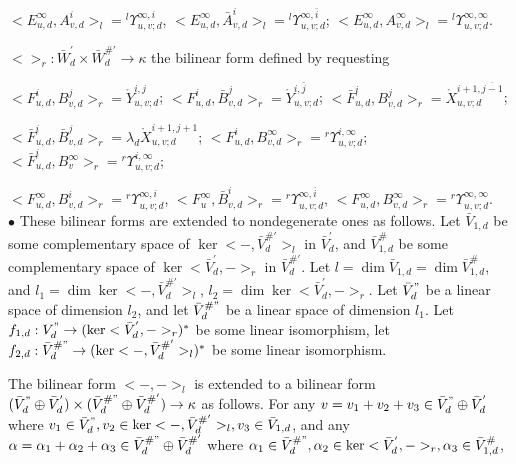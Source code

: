\def\CTEXPreproc{Created by ctex v0.2.12, don't edit!}\documentclass[11pt]{article}
\begin{document}
\begin{pf}
 \noindent $< E^{\infty} _{u,d} , A^{i} _{v,d}   >_l ={}^{l}\Upsilon^{\infty,i}_{u,v;d}$,  $< E^{\infty} _{u,d} , \bar{A}^{i} _{v,d}   >_l ={}^{l}\Upsilon^{\infty,\bar{i}}_{u,v;d} $; $< E^{\infty}_{u,d} , A^{\infty}_{v,d}  >_l ={}^{l}\Upsilon^{\infty,\infty}_{u,v;d}. $

\noindent $ < >_r : \bar{W}^{'}_{d} \times \bar{W}^{\# '}_{d} \rightarrow \kappa    $ the bilinear form defined by requesting

     \noindent $< F^i _{u,d} , B^j _{v,d}   >_r =\mathring{Y}^{i,j}_{u,v;d} $; $< F^i _{u,d} , \bar{B}^j _{v,d}   >_r =\mathring{Y}^{i,\bar{j}}_{u,v;d} $; $< \bar{F}^i _{u,d} , B^j _{v,d}   >_r =\mathring{X}^{i+1,\overline{j-1}}_{u,v;d}$;

 \noindent $< \bar{F}^i _{u,d} , \bar{B}^j _{v,d}   >_r =\lambda_d \mathring{X}^{i+1,j+1}_{u,v;d} $;  $< F^i _{u,d} , B^{\infty} _{v,d}   >_r ={}^{r} \Upsilon^{i,\infty}_{u,v;d}  $;  $< \bar{F}^i _{u,d} , B^{\infty} _{v}   >_r ={}^{r} \Upsilon^{i ,\infty}_{u,v;d}$;

  \noindent $< F^{\infty} _{u,d} , B^{i} _{v,d}   >_r ={}^{r} \Upsilon^{\infty,i}_{u,v;d} $,  $< F^{\infty} _{u} , \bar{B}^{i} _{v,d}   >_r ={}^{r} \Upsilon^{\infty,\bar{i}}_{u,v;d} $,  $< F^{\infty}_{u,d} , B^{\infty}_{v,d}  >_r ={}^{r} \Upsilon^{\infty, \infty}_{u,v;d} .  $    \\

  \noindent $\bullet$ These bilinear forms are extended to nondegenerate ones as follows. Let $\bar{V}_{1,d} $ be some complementary space of $\ker<-, \bar{V}^{\# '}_d  >_l  $ in $\bar{V}^{'}_d$, and $\bar{V}^{\#} _{1,d}$ be some complementary space of $\ker< \bar{V}^{'}_d ,->_r  $ in $\bar{V}^{\# '}_d $. Let $l=\dim \bar{V}_{1,d} =\dim \bar{V}^{\#} _{1,d} $, and $l_1 =\dim \ker<-, \bar{V}^{\# '}_d  >_l $, $l_2 =\dim \ker< \bar{V}^{'}_d ,->_r$.
     Let $\bar{V}^{"}_d $ be a linear space of dimension $l_2$,  and let $\bar{V}^{\# "}_d $  be a linear space of dimension $l_1$.
     Let $f_{1,d} : V^{"}_d \rightarrow ( \ker< \bar{V}^{'}_d ,->_r )^{*} $ be some linear isomorphism, let $f_{2,d} : \bar{V}^{\# "}_d \rightarrow (\ker<-, \bar{V}^{\# '}_d  >_l  )^{*} $ be some linear isomorphism.

     The bilinear form $<-,->_l $ is extended to a bilinear form  $   (\bar{V}^{"}_d \oplus \bar{V}^{'}_d ) \times  (\bar{V}^{\# "}_d \oplus \bar{V}^{\# '} _d )\rightarrow \kappa $ as follows.
For any $v= v_1 + v_2 + v_3 \in \bar{V}^{"}_d \oplus \bar{V}^{'}_d $ where $v_1 \in \bar{V}^{"}_d , v_2 \in \ker<-, \bar{V}^{\# '}_d  >_l ,v_3 \in \bar{V}_{1,d}$,    and any $\alpha = \alpha_1 +\alpha_2 +\alpha_3 \in \bar{V}^{\# "}_d \oplus \bar{V}^{\# '}_d $ where $\alpha_1 \in \bar{V}^{\# "}_d , \alpha_2 \in \ker< \bar{V}^{'}_d ,->_r ,\alpha_3 \in \bar{V}^{\#} _{1,d}$,


\end{pf}
\end{document}
